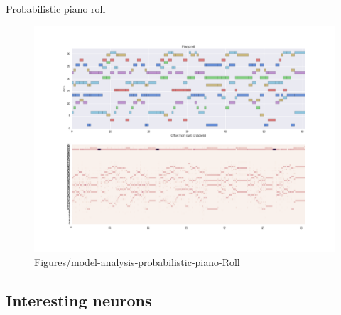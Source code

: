 \documentclass[dissertation.tex]{subfiles}
\begin{document}
Probabilistic piano roll
\begin{figure}[htpb]
    \centering
    \includegraphics[width=1.0\linewidth]{Figures/model-analysis-probabilistic-piano-roll.png}
    \caption{Figures/model-analysis-probabilistic-piano-Roll}
    \label{fig:Figures/model-analysis-probabilistic-piano-roll}
\end{figure}

\subsection{Interesting neurons}


\printbibliography
\end{document}

